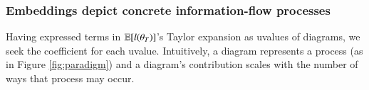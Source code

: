             \subsubsection{Embeddings depict concrete information-flow processes}\label{sect:embeddings}
            Having expressed terms in $\mathbb{E}[l(\theta_T)]$'s Taylor expansion %
            as uvalues of
            diagrams, we seek the coefficient for each uvalue.  Intuitively, a
            diagram represents a process (as in Figure \ref{fig:paradigm}) and
            a diagram's contribution scales with the number of ways that
            process may occur.
